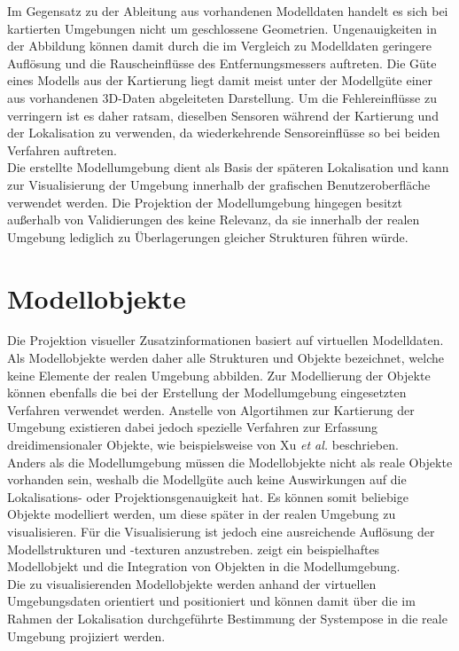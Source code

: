 Im Gegensatz zu der Ableitung aus vorhandenen Modelldaten handelt es sich bei kartierten Umgebungen nicht um geschlossene Geometrien. Ungenauigkeiten in der Abbildung können damit durch die im Vergleich zu Modelldaten geringere Auflösung und die Rauscheinflüsse des Entfernungsmessers auftreten. Die Güte eines Modells aus der Kartierung liegt damit meist unter der Modellgüte einer aus vorhandenen 3D-Daten abgeleiteten Darstellung. Um die Fehlereinflüsse zu verringern ist es daher ratsam, dieselben Sensoren während der Kartierung und der Lokalisation zu verwenden, da wiederkehrende Sensoreinflüsse so bei beiden Verfahren auftreten.\\

Die erstellte Modellumgebung dient als Basis der späteren Lokalisation und kann zur Visualisierung der Umgebung innerhalb der grafischen Benutzeroberfläche verwendet werden. Die Projektion der Modellumgebung hingegen besitzt außerhalb von Validierungen des  keine Relevanz, da sie innerhalb der realen Umgebung lediglich zu Überlagerungen gleicher Strukturen führen würde.

\section{Modellobjekte}
Die Projektion visueller Zusatzinformationen basiert auf virtuellen Modelldaten. Als Modellobjekte werden daher alle Strukturen und Objekte bezeichnet, welche keine Elemente der realen Umgebung abbilden. Zur Modellierung der Objekte können ebenfalls die bei der Erstellung der Modellumgebung eingesetzten Verfahren verwendet werden. Anstelle von Algortihmen zur Kartierung der Umgebung existieren dabei jedoch spezielle Verfahren zur Erfassung dreidimensionaler Objekte, wie beispielsweise von Xu \textit{et al.} \cite{Xu2012} beschrieben.\\

Anders als die Modellumgebung müssen die Modellobjekte nicht als reale Objekte vorhanden sein, weshalb die Modellgüte auch keine Auswirkungen auf die Lokalisations- oder Projektionsgenauigkeit hat. Es können somit beliebige Objekte modelliert werden, um diese später in der realen Umgebung zu visualisieren.  Für die Visualisierung ist jedoch eine ausreichende Auflösung der Modellstrukturen und -texturen anzustreben.  zeigt ein beispielhaftes Modellobjekt und die Integration von Objekten in die Modellumgebung.\\
Die zu visualisierenden Modellobjekte werden anhand der virtuellen Umgebungsdaten orientiert und positioniert und können damit über die im Rahmen der Lokalisation durchgeführte Bestimmung der Systempose in die reale Umgebung projiziert werden.

